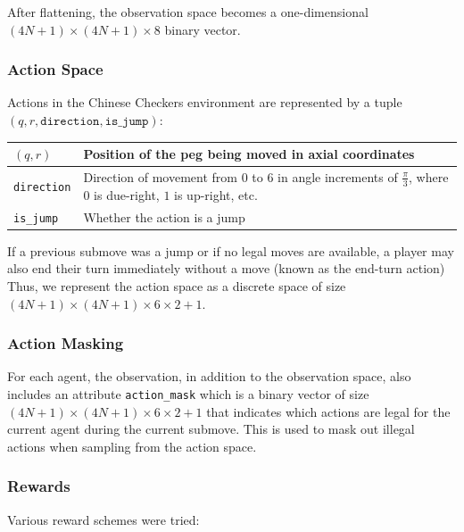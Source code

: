 \documentclass[12pt, a4paper, twocolumn]{article}
\begin{document}
After flattening, the observation space becomes a one-dimensional $(4N + 1) \times (4N + 1) \times 8$ binary vector.


\subsubsection{Action Space}

Actions in the Chinese Checkers environment are represented by a tuple $(q, r, \texttt{direction}, \texttt{is\_jump})$:

\begin{center}
  \begin{tabular}{|m{}|m{}|}
    \hline
    $(q, r)$ & Position of the peg being moved in axial coordinates \\
    \hline
    \texttt{direction} & Direction of movement from $0$ to $6$ in angle increments of $\frac{\pi}{3}$, where $0$ is due-right, $1$ is up-right, etc. \\
    \hline
    \texttt{is\_jump} & Whether the action is a jump \\
    \hline
  \end{tabular}
  \end{center}

  If a previous submove was a jump or if no legal moves are available, a player may also end their turn immediately without a move (known as the end-turn action)  Thus, we represent the action space as a discrete space of size $(4N + 1) \times (4N + 1) \times 6 \times 2 + 1$.

\subsubsection{Action Masking}

For each agent, the observation, in addition to the observation space, also includes an attribute \texttt{action\_mask} which is a binary vector of size $(4N + 1) \times (4N + 1) \times 6 \times 2 + 1$ that indicates which actions are legal for the current agent during the current submove. This is used to mask out illegal actions when sampling from the action space.

\subsubsection{Rewards}

Various reward schemes were tried:
\end{document}
